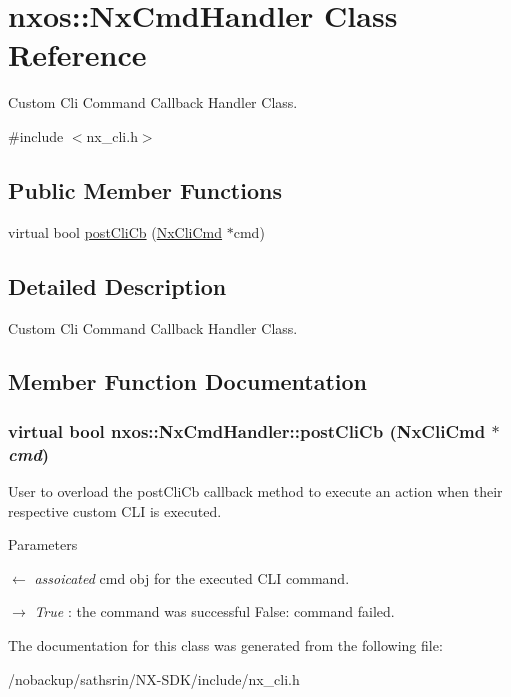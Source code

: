 \hypertarget{classnxos_1_1NxCmdHandler}{
\section{nxos::NxCmdHandler Class Reference}
\label{classnxos_1_1NxCmdHandler}
}


Custom Cli Command Callback Handler Class.  


{\ttfamily \#include $<$nx\_\-cli.h$>$}\subsection*{Public Member Functions}
\begin{DoxyCompactItemize}
\item 
virtual bool \hyperlink{classnxos_1_1NxCmdHandler_ab60a4672e08b1acd1faa249936963ead}{postCliCb} (\hyperlink{classnxos_1_1NxCliCmd}{NxCliCmd} $\ast$cmd)
\end{DoxyCompactItemize}


\subsection{Detailed Description}
Custom Cli Command Callback Handler Class. 

\subsection{Member Function Documentation}
\hypertarget{classnxos_1_1NxCmdHandler_ab60a4672e08b1acd1faa249936963ead}{
\subsubsection[{postCliCb}]{\setlength{\rightskip}{0pt plus 5cm}virtual bool nxos::NxCmdHandler::postCliCb ({\bf NxCliCmd} $\ast$ {\em cmd})}}
\label{classnxos_1_1NxCmdHandler_ab60a4672e08b1acd1faa249936963ead}
User to overload the postCliCb callback method to execute an action when their respective custom CLI is executed. 
\begin{DoxyParams}{Parameters}
\item[\mbox{$\leftarrow$} {\em assoicated}]cmd obj for the executed CLI command. \item[\mbox{$\rightarrow$} {\em True}]: the command was successful False: command failed. \end{DoxyParams}


The documentation for this class was generated from the following file:\begin{DoxyCompactItemize}
\item 
/nobackup/sathsrin/NX-\/SDK/include/nx\_\-cli.h\end{DoxyCompactItemize}
